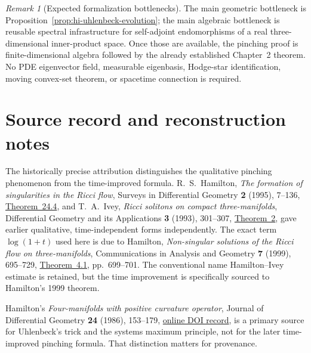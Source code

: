 \documentclass[10pt]{coll-l}
\theoremstyle{definition}
\theoremstyle{remark}
\newtheorem{remark}[theorem]{Remark}
\numberwithin{section}{chapter}
\numberwithin{equation}{chapter}
\begin{document}
\begin{remark}[Expected formalization bottlenecks]
\label{rem:hi-formal-bottlenecks}
The main geometric bottleneck is
Proposition~\ref{prop:hi-uhlenbeck-evolution}; the main algebraic
bottleneck is reusable spectral infrastructure for self-adjoint
endomorphisms of a real three-dimensional inner-product space.  Once those
are available, the pinching proof is finite-dimensional algebra followed
by the already established Chapter~2 theorem.  No PDE eigenvector field,
measurable eigenbasis, Hodge-star identification, moving convex-set theorem,
or spacetime connection is required.
\end{remark}

\section{Source record and reconstruction notes}
\label{sec:hi-sources}

The historically precise attribution distinguishes the qualitative
pinching phenomenon from the time-improved formula.  R.~S.~Hamilton,
\emph{The formation of singularities in the Ricci flow}, Surveys in
Differential Geometry \textbf{2} (1995), 7--136,
\href{https://doi.org/10.4310/SDG.1993.v2.n1.a2}{Theorem~24.4},
and T.~A.~Ivey,
\emph{Ricci solitons on compact three-manifolds}, Differential Geometry and
its Applications \textbf{3} (1993), 301--307,
\href{https://doi.org/10.1016/0926-2245(93)90008-O}{Theorem~2},
gave earlier qualitative, time-independent forms independently.  The exact
term $\log(1+t)$ used here is due to Hamilton,
\emph{Non-singular solutions of the Ricci flow on three-manifolds},
Communications in Analysis and Geometry \textbf{7} (1999), 695--729,
\href{https://doi.org/10.4310/CAG.1999.v7.n4.a2}{Theorem~4.1},
pp.~699--701.  The conventional name Hamilton--Ivey estimate is retained,
but the time improvement is specifically sourced to Hamilton's 1999
theorem.

Hamilton's \emph{Four-manifolds with positive curvature operator}, Journal
of Differential Geometry \textbf{24} (1986), 153--179,
\href{https://doi.org/10.4310/jdg/1214440433}{online DOI record},
is a primary source for Uhlenbeck's trick and the systems maximum principle,
not for the later time-improved pinching formula.  That distinction matters
for provenance.
\end{document}
